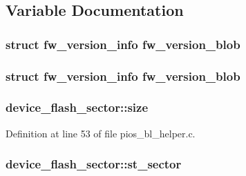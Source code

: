 \subsection{Variable Documentation}
\hypertarget{group___p_i_o_s___b_o_o_t_l_o_a_d_e_r_gacd0b013dbbd43ca8382c7c234f1ee5a2}{
\subsubsection[{fw\-\_\-version\-\_\-blob}]{\setlength{\rightskip}{0pt plus 5cm}struct fw\-\_\-version\-\_\-info fw\-\_\-version\-\_\-blob}}\label{group___p_i_o_s___b_o_o_t_l_o_a_d_e_r_gacd0b013dbbd43ca8382c7c234f1ee5a2}
\hypertarget{group___p_i_o_s___b_o_o_t_l_o_a_d_e_r_gacd0b013dbbd43ca8382c7c234f1ee5a2}{
\subsubsection[{fw\-\_\-version\-\_\-blob}]{\setlength{\rightskip}{0pt plus 5cm}struct fw\-\_\-version\-\_\-info fw\-\_\-version\-\_\-blob}}\label{group___p_i_o_s___b_o_o_t_l_o_a_d_e_r_gacd0b013dbbd43ca8382c7c234f1ee5a2}
\hypertarget{group___p_i_o_s___b_o_o_t_l_o_a_d_e_r_ga53bfb33fe9a388542e57e8314108fd0a}{
\subsubsection[{size}]{ device\-\_\-flash\-\_\-sector\-::size}}\label{group___p_i_o_s___b_o_o_t_l_o_a_d_e_r_ga53bfb33fe9a388542e57e8314108fd0a}


Definition at line 53 of file pios\-\_\-bl\-\_\-helper.\-c.

\hypertarget{group___p_i_o_s___b_o_o_t_l_o_a_d_e_r_gaf71821c5c2fdb240c7d27d8371b38fbd}{
\subsubsection[{st\-\_\-sector}]{ device\-\_\-flash\-\_\-sector\-::st\-\_\-sector}}\label{group___p_i_o_s___b_o_o_t_l_o_a_d_e_r_gaf71821c5c2fdb240c7d27d8371b38fbd}


